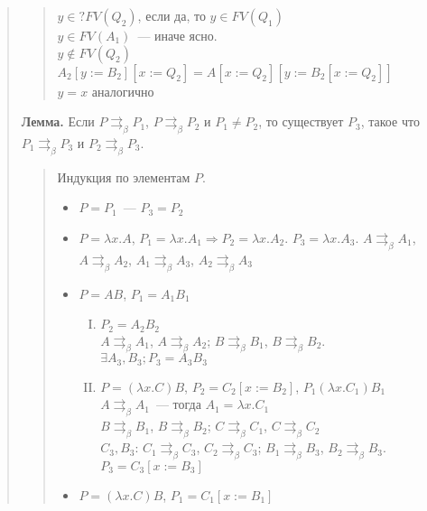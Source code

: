 \documentclass[12pt]{article}
\begin{document}
\begin{quote}
\begin{quote}
\begin{itemize}
\begin{itemize}
					$y \in ? FV(Q_2)$, если да, то $y \in FV(Q_1)$ \\
					$y \in FV(A_1)$~--- иначе ясно. \\
					$y \not\in FV(Q_2)$ \\
					$A_2 [y := B_2][x := Q_2] = A [x := Q_2][y := B_2 [x := Q_2]]$ \\
					$y = x$ аналогично
				\end{itemize}
			\end{itemize}
		\end{quote}
		\textbf{Лемма.} Если $P \rightrightarrows_{\beta} P_1$, $P \rightrightarrows_{\beta} P_2$ и $P_1 \not= P_2$, то существует $P_3$, такое что $P_1 \rightrightarrows_{\beta} P_3$ и $P_2 \rightrightarrows_{\beta} P_3$.
		\begin{quote}
			Индукция по элементам $P$.
			\begin{itemize}
				\item $P = P_1$~--- $P_3 = P_2$
				\item $P = \lambda x. A$, $P_1 = \lambda x. A_1 \Rightarrow P_2 = \lambda x. A_2$. $P_3 = \lambda x. A_3$. $A \rightrightarrows_{\beta} A_1$, $A \rightrightarrows_{\beta} A_2$, $A_1 \rightrightarrows_{\beta} A_3$, $A_2 \rightrightarrows_{\beta} A_3$
				\item $P = AB$, $P_1 = A_1B_1$
				\begin{enumerate}[(I)]
					\item $P_2 = A_2B_2$ \\
					$A \rightrightarrows_{\beta} A_1$, $A \rightrightarrows_{\beta} A_2$; $B \rightrightarrows_{\beta} B_1$, $B \rightrightarrows_{\beta} B_2$. \\
					$\exists A_3, B_3; P_3 = A_3B_3$
					\item $P = (\lambda x. C)B$, $P_2 = C_2 [x := B_2]$, $P_1 (\lambda x. C_1) B_1$ \\
					$A \rightrightarrows_{\beta} A_1$~--- тогда $A_1 = \lambda x. C_1$ \\
					$B \rightrightarrows_{\beta} B_1$, $B \rightrightarrows_{\beta} B_2$; $C \rightrightarrows_{\beta} C_1$, $C \rightrightarrows_{\beta} C_2$ \\
					$C_3, B_3$: $C_1 \rightrightarrows_{\beta} C_3$, $C_2 \rightrightarrows_{\beta} C_3$; $B_1 \rightrightarrows_{\beta} B_3$, $B_2 \rightrightarrows_{\beta} B_3$. $P_3 = C_3 [x := B_3]$
				\end{enumerate}
				\item $P = (\lambda x. C)B$, $P_1 = C_1 [x := B_1]$
				\begin{enumerate}[(I)]

\end{enumerate}
\end{itemize}
\end{quote}
\end{quote}
\end{document}
